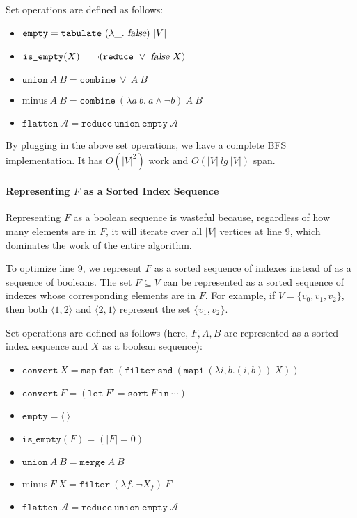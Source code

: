 \documentclass[11pt,a4paper,oneside,microtype,nokorean]{oblivoir}
\newcommand{\kwfalse}{\textsl{false}}
\begin{document}
Set operations are defined as follows:

\begin{itemize}
\item $\texttt{empty} = \texttt{tabulate}~(\lambda \_.~\kwfalse)~|V|$
\item $\texttt{is\_empty}(X) = \neg (\texttt{reduce}~\lor~\kwfalse~X)$
\item $\texttt{union}~A~B = \texttt{combine}~\lor~A~B$
\item $\textrm{minus}~A~B = \texttt{combine}~(\lambda a~b.~a \land \neg b)~A~B$
\item $\texttt{flatten}~\mathcal{A} = \texttt{reduce}~\texttt{union}~\texttt{empty}~\mathcal{A}$
\end{itemize}

By plugging in the above set operations, we have a complete BFS implementation.  It has $O(|V|^2)$
work and $O(|V|~lg~|V|)$ span.


\paragraph{Representing $F$ as a Sorted Index Sequence}

Representing $F$ as a boolean sequence is wasteful because, regardless of how many elements are in
$F$, it will iterate over all $|V|$ vertices at line 9, which dominates the work of the entire
algorithm.

To optimize line 9, we represent $F$ as a sorted sequence of indexes instead of as a sequence of
booleans.  The set $F \subseteq V$ can be represented as a sorted sequence of indexes whose
corresponding elements are in $F$.  For example, if $V = \{v_0,v_1,v_2\}$, then both
$\langle 1,2 \rangle$ and $\langle 2,1 \rangle$ represent the set $\{v_1,v_2\}$.

Set operations are defined as follows (here, $F,A,B$ are represented as a sorted index sequence and
$X$ as a boolean sequence):

\begin{itemize}
\item $\texttt{convert}~X = \texttt{map}~\texttt{fst}~(\texttt{filter}~\texttt{snd}~(\texttt{mapi}~(\lambda i,b. (i,b))~X))$
\item $\texttt{convert}~F = (\texttt{let}~F' = \texttt{sort}~F~\texttt{in}~\cdots)$
\item $\texttt{empty} = \langle~\rangle$
\item $\texttt{is\_empty}(F) = (|F| = 0)$
\item $\texttt{union}~A~B = \texttt{merge}~A~B$
\item $\textrm{minus}~F~X = \texttt{filter}~(\lambda f.~\neg X_f)~F$
\item $\texttt{flatten}~\mathcal{A} = \texttt{reduce}~\texttt{union}~\texttt{empty}~\mathcal{A}$
\end{itemize}
\end{document}
